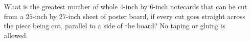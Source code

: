 What is the greatest number of whole $4$-inch by $6$-inch notecards that can be cut from a $25$-inch by $27$-inch sheet of poster board, if every cut goes straight across the piece being cut, parallel to a side of the board? No taping or gluing is allowed.
